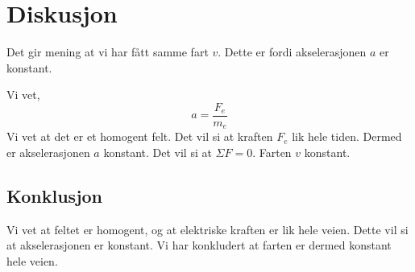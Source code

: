 \documentclass[a4paper]{article}
\begin{document}
\section{Diskusjon} %
\label{sec:diskusjon}
\begin{flushleft}
	Det gir mening at vi har fått samme fart $v$. Dette er fordi akselerasjonen $a$ er konstant.
\end{flushleft}
Vi vet,
\[
a = \frac{F_e}{m_e}
\]
Vi vet at det er et homogent felt. Det vil si at kraften $F_e$ lik hele tiden. Dermed er akselerasjonen $a$ konstant. Det vil si at $\Sigma F = 0$. Farten $v$ konstant. 
\subsection{Konklusjon} %
\begin{flushleft}
	Vi vet at feltet er homogent, og at elektriske kraften er lik hele veien. Dette vil si at akselerasjonen er konstant. Vi har konkludert at farten er dermed konstant hele veien. 
\end{flushleft}
\end{document}
